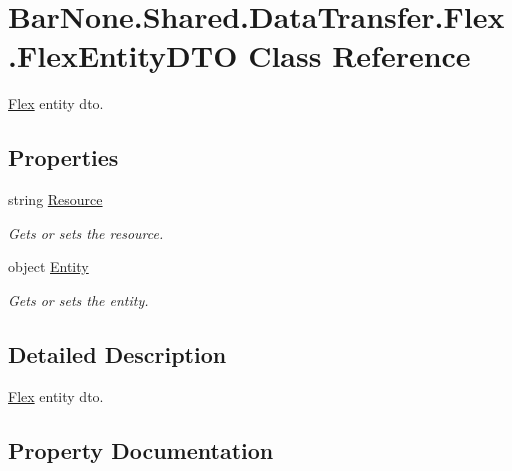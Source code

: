\hypertarget{class_bar_none_1_1_shared_1_1_data_transfer_1_1_flex_1_1_flex_entity_d_t_o}{}\section{Bar\+None.\+Shared.\+Data\+Transfer.\+Flex.\+Flex\+Entity\+D\+TO Class Reference}
\label{class_bar_none_1_1_shared_1_1_data_transfer_1_1_flex_1_1_flex_entity_d_t_o}


\mbox{\hyperlink{namespace_bar_none_1_1_shared_1_1_data_transfer_1_1_flex}{Flex}} entity dto.  


\subsection*{Properties}
\begin{DoxyCompactItemize}
\item 
string \mbox{\hyperlink{class_bar_none_1_1_shared_1_1_data_transfer_1_1_flex_1_1_flex_entity_d_t_o_aa11ec43faf9d40bc684370438f77c4dc}{Resource}}
\begin{DoxyCompactList}\small\item\em Gets or sets the resource. \end{DoxyCompactList}\item 
object \mbox{\hyperlink{class_bar_none_1_1_shared_1_1_data_transfer_1_1_flex_1_1_flex_entity_d_t_o_ae328e80fdd86a2342491b59a46b261aa}{Entity}}
\begin{DoxyCompactList}\small\item\em Gets or sets the entity. \end{DoxyCompactList}\end{DoxyCompactItemize}


\subsection{Detailed Description}
\mbox{\hyperlink{namespace_bar_none_1_1_shared_1_1_data_transfer_1_1_flex}{Flex}} entity dto. 



\subsection{Property Documentation}
\mbox{\label{class_bar_none_1_1_shared_1_1_data_transfer_1_1_flex_1_1_flex_entity_d_t_o_ae328e80fdd86a2342491b59a46b261aa}} 
